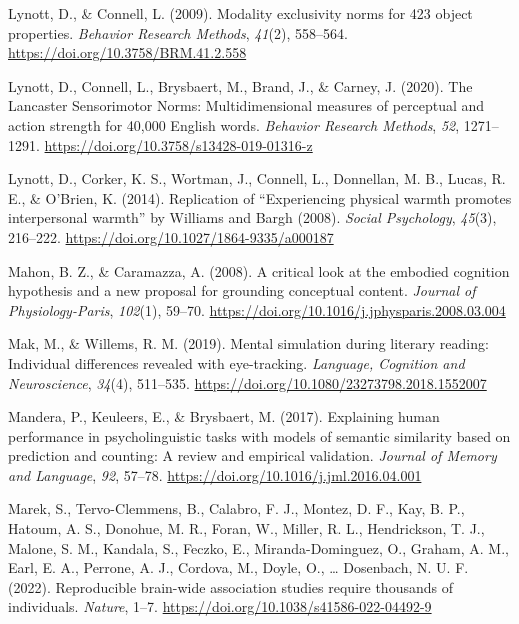 \documentclass[
  12pt,
  man,floatsintext]{apa7}
\newlength{\cslhangindent}
\newlength{\cslentryspacingunit} %
\newenvironment{CSLReferences}[2] %
 {%
  \setlength{\parindent}{0pt}
  \ifodd #1
  \let\oldpar\par
  \def\par{\hangindent=\cslhangindent\oldpar}
  \fi
  \setlength{\parskip}{#2\cslentryspacingunit}
 }%
 {}
\begin{document}
\begin{CSLReferences}{1}{0}
\leavevmode{}%
Lynott, D., \& Connell, L. (2009). Modality exclusivity norms for 423 object properties. \emph{Behavior Research Methods}, \emph{41}(2), 558--564. \url{https://doi.org/10.3758/BRM.41.2.558}

\leavevmode{}%
Lynott, D., Connell, L., Brysbaert, M., Brand, J., \& Carney, J. (2020). The {Lancaster Sensorimotor Norms}: {Multidimensional} measures of perceptual and action strength for 40,000 {English} words. \emph{Behavior Research Methods}, \emph{52}, 1271--1291. \url{https://doi.org/10.3758/s13428-019-01316-z}

\leavevmode{}%
Lynott, D., Corker, K. S., Wortman, J., Connell, L., Donnellan, M. B., Lucas, R. E., \& O'Brien, K. (2014). Replication of {``{Experiencing} physical warmth promotes interpersonal warmth''} by {Williams} and {Bargh} (2008). \emph{Social Psychology}, \emph{45}(3), 216--222. \url{https://doi.org/10.1027/1864-9335/a000187}

\leavevmode{}%
Mahon, B. Z., \& Caramazza, A. (2008). A critical look at the embodied cognition hypothesis and a new proposal for grounding conceptual content. \emph{Journal of Physiology-Paris}, \emph{102}(1), 59--70. \url{https://doi.org/10.1016/j.jphysparis.2008.03.004}

\leavevmode{}%
Mak, M., \& Willems, R. M. (2019). Mental simulation during literary reading: {Individual} differences revealed with eye-tracking. \emph{Language, Cognition and Neuroscience}, \emph{34}(4), 511--535. \url{https://doi.org/10.1080/23273798.2018.1552007}

\leavevmode{}%
Mandera, P., Keuleers, E., \& Brysbaert, M. (2017). Explaining human performance in psycholinguistic tasks with models of semantic similarity based on prediction and counting: {A} review and empirical validation. \emph{Journal of Memory and Language}, \emph{92}, 57--78. \url{https://doi.org/10.1016/j.jml.2016.04.001}

\leavevmode{}%
Marek, S., Tervo-Clemmens, B., Calabro, F. J., Montez, D. F., Kay, B. P., Hatoum, A. S., Donohue, M. R., Foran, W., Miller, R. L., Hendrickson, T. J., Malone, S. M., Kandala, S., Feczko, E., Miranda-Dominguez, O., Graham, A. M., Earl, E. A., Perrone, A. J., Cordova, M., Doyle, O., \ldots{} Dosenbach, N. U. F. (2022). Reproducible brain-wide association studies require thousands of individuals. \emph{Nature}, 1--7. \url{https://doi.org/10.1038/s41586-022-04492-9}


\end{CSLReferences}
\end{document}
